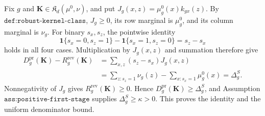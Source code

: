 Fix \(g\) and \(\mathbf K\in\mathfrak K_d(\mu^0,\nu)\), and put
\(J_g(x,z)=\mu_g^0(x)k_{gx}(z)\).  By \(\texttt{def:robust-kernel-class}\), \(J_g\ge0\), its row marginal is \(\mu_g^0\), and its column marginal is \(\nu_g\).  For binary \(s_x,s_z\), the pointwise identity
\[
 \mathbf 1\{s_x=0,s_z=1\}-\mathbf 1\{s_x=1,s_z=0\}
 =s_z-s_x
\]
holds in all four cases.  Multiplication by \(J_g(x,z)\) and summation therefore give
\[
\begin{aligned}
 D_g^{\mathrm{pr}}(\mathbf K)-R_g^{\mathrm{rev}}(\mathbf K)
 &=\sum_{x,z}(s_z-s_x)J_g(x,z)\\
 &=\sum_{z:s_z=1}\nu_g(z)-\sum_{x:s_x=1}\mu_g^0(x)
 =\Delta_g^S.
\end{aligned}
\]
Nonnegativity of \(J_g\) gives \(R_g^{\mathrm{rev}}(\mathbf K)\ge0\).  Hence
\(D_g^{\mathrm{pr}}(\mathbf K)\ge\Delta_g^S\), and Assumption \(\texttt{ass:positive-first-stage}\) supplies \(\Delta_g^S\ge\kappa>0\).  This proves the identity and the uniform denominator bound.